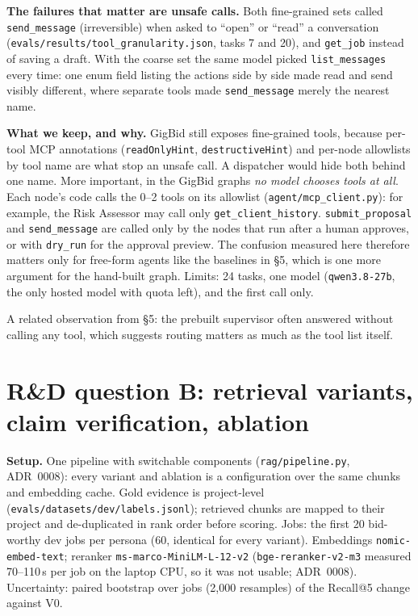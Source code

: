 \documentclass[10pt,a4paper]{article}
\newcommand{\res}[1]{\texttt{\small evals/results/#1}}
\newcommand{\code}[1]{\texttt{\small #1}}
\begin{document}
\textbf{The failures that matter are unsafe calls.} Both fine-grained sets called \code{send\_message} (irreversible) when asked to ``open'' or ``read'' a conversation (\res{tool\_granularity.json}, tasks 7 and 20), and \code{get\_job} instead of saving a draft. With the coarse set the same model picked \code{list\_messages} every time: one enum field listing the actions side by side made read and send visibly different, where separate tools made \code{send\_message} merely the nearest name.

\textbf{What we keep, and why.} GigBid still exposes fine-grained tools, because per-tool MCP annotations (\code{readOnlyHint}, \code{destructiveHint}) and per-node allowlists by tool name are what stop an unsafe call. A dispatcher would hide both behind one name. More important, in the GigBid graphs \emph{no model chooses tools at all}. Each node's code calls the 0--2 tools on its allowlist (\code{agent/mcp\_client.py}): for example, the Risk Assessor may call only \code{get\_client\_history}. \code{submit\_proposal} and \code{send\_message} are called only by the nodes that run after a human approves, or with \code{dry\_run} for the approval preview. The confusion measured here therefore matters only for free-form agents like the baselines in \S5, which is one more argument for the hand-built graph. Limits: 24 tasks, one model (\code{qwen3.8-27b}, the only hosted model with quota left), and the first call only.

A related observation from \S5: the prebuilt supervisor often answered without calling any tool, which suggests routing matters as much as the tool list itself.

\section{R\&D question B: retrieval variants, claim verification, ablation}

\textbf{Setup.} One pipeline with switchable components (\code{rag/pipeline.py}, ADR~0008): every variant and ablation is a configuration over the same chunks and embedding cache. Gold evidence is project-level (\code{evals/datasets/dev/labels.jsonl}); retrieved chunks are mapped to their project and de-duplicated in rank order before scoring. Jobs: the first 20 bid-worthy dev jobs per persona (60, identical for every variant). Embeddings \code{nomic-embed-text}; reranker \code{ms-marco-MiniLM-L-12-v2} (\code{bge-reranker-v2-m3} measured 70--110\,s per job on the laptop CPU, so it was not usable; ADR~0008). Uncertainty: paired bootstrap over jobs (2{,}000 resamples) of the Recall@5 change against V0.
\end{document}
